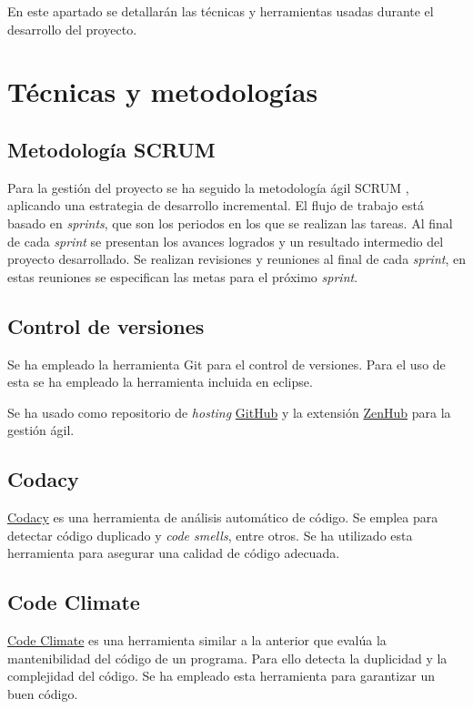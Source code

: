 En este apartado se detallarán las técnicas y herramientas usadas durante el desarrollo del proyecto.

\section{Técnicas y metodologías}
\subsection{Metodología SCRUM}
Para la gestión del proyecto se ha seguido la metodología ágil SCRUM \cite{wiki:scrum}, aplicando una estrategia de desarrollo incremental. El flujo de trabajo está basado en \emph{sprints}, que son los periodos en los que se realizan las tareas. Al final de cada \emph{sprint} se presentan los avances logrados y un resultado intermedio del proyecto desarrollado. Se realizan revisiones y reuniones al final de cada \emph{sprint}, en estas reuniones se especifican las metas para el próximo \emph{sprint}.

\subsection{Control de versiones}
Se ha empleado la herramienta Git \cite{wiki:git} para el control de versiones. Para el uso de esta se ha empleado la herramienta incluida en eclipse.

Se ha usado como repositorio de \emph{hosting} \href{https://github.com/}{GitHub} y la extensión \href{https://www.zenhub.com/}{ZenHub} para la gestión ágil.

\subsection{Codacy}
\href{https://www.codacy.com/}{Codacy} es una herramienta de análisis automático de código. Se emplea para detectar código duplicado y \emph{code smells}, entre otros. Se ha utilizado esta herramienta para asegurar una calidad de código adecuada.

\subsection{Code Climate}
\href{https://codeclimate.com/}{Code Climate} es una herramienta similar a la anterior que evalúa la mantenibilidad del código de un programa. Para ello detecta la duplicidad y la complejidad del código. Se ha empleado esta herramienta para garantizar un buen código.

